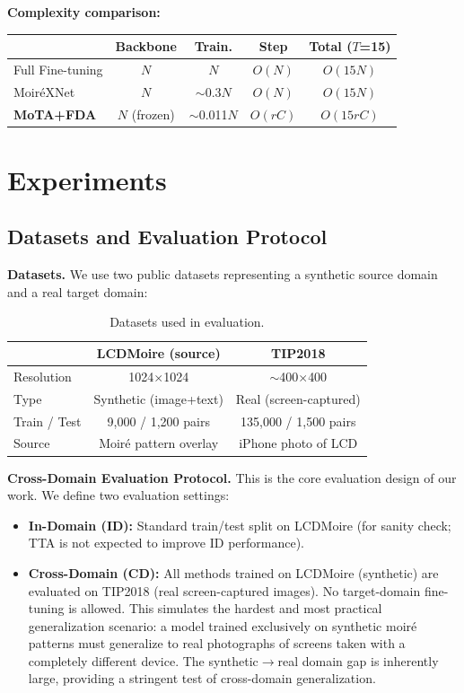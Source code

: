 \documentclass[review,10pt]{elsarticle}
\begin{document}
\textbf{Complexity comparison:}
\begin{center}
\footnotesize
\setlength{\tabcolsep}{2.5pt}
\begin{tabular}{@{}lcccc@{}}
\toprule
 & Backbone & Train. & Step & Total ($T$=15) \\
\midrule
Full Fine-tuning & $N$ & $N$ & $O(N)$ & $O(15N)$ \\
Moir\'{e}XNet & $N$ & $\sim$0.3$N$ & $O(N)$ & $O(15N)$ \\
\textbf{MoTA+FDA} & $N$ (frozen) & $\sim$0.011$N$ & $O(rC)$ & $O(15rC)$ \\
\bottomrule
\end{tabular}
\end{center}



\section{Experiments}

\subsection{Datasets and Evaluation Protocol}

\textbf{Datasets.} We use two public datasets representing a synthetic source domain and a real target domain:
\begin{table}[tb]
\centering
\footnotesize
\caption{Datasets used in evaluation.}
\label{tab:datasets}
\begin{tabular}{@{}p{2.2cm}cc@{}}
\toprule
& \textbf{LCDMoire} (source) \cite{zheng2022learning} & \textbf{TIP2018} \cite{sun2018moire} \\
\midrule
Resolution & 1024$\times$1024 & $\sim$400$\times$400 \\
Type & Synthetic (image+text) & Real (screen-captured) \\
Train / Test & 9,000 / 1,200 pairs & 135,000 / 1,500 pairs \\
Source & Moir\'{e} pattern overlay & iPhone photo of LCD \\
\bottomrule
\end{tabular}
\end{table}

\textbf{Cross-Domain Evaluation Protocol.} This is the core evaluation design of our work. We define two evaluation settings:
\begin{itemize}
    \item \textbf{In-Domain (ID):} Standard train/test split on LCDMoire (for sanity check; TTA is not expected to improve ID performance).
    \item \textbf{Cross-Domain (CD):} All methods trained on LCDMoire (synthetic) are evaluated on TIP2018 (real screen-captured images). No target-domain fine-tuning is allowed. This simulates the hardest and most practical generalization scenario: a model trained exclusively on synthetic moir\'{e} patterns must generalize to real photographs of screens taken with a completely different device. The synthetic$\to$real domain gap is inherently large, providing a stringent test of cross-domain generalization.
\end{itemize}
\end{document}
